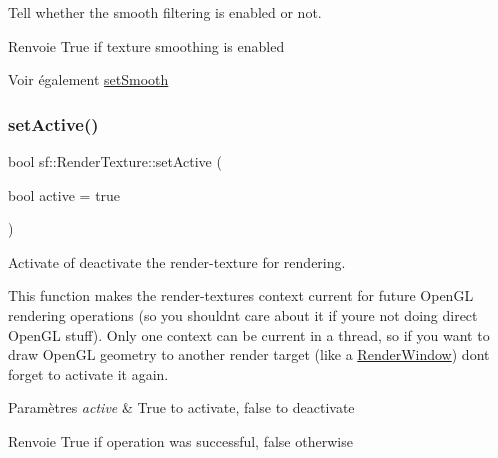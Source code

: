 Tell whether the smooth filtering is enabled or not. 

\begin{DoxyReturn}{Renvoie}
True if texture smoothing is enabled
\end{DoxyReturn}
\begin{DoxySeeAlso}{Voir également}
\hyperlink{classsf_1_1RenderTexture_af08991e63c6020865dd07b20e27305b6}{set\+Smooth} 
\end{DoxySeeAlso}
\mbox{\label{classsf_1_1RenderTexture_a5da95ecdbce615a80bb78399012508cf}} 
\subsubsection{\texorpdfstring{set\+Active()}{setActive()}}
{\footnotesize\ttfamily bool sf\+::\+Render\+Texture\+::set\+Active (\begin{DoxyParamCaption}\item[{bool}]{active = {\ttfamily true} }\end{DoxyParamCaption})}



Activate of deactivate the render-\/texture for rendering. 

This function makes the render-\/texture\textquotesingle{}s context current for future Open\+GL rendering operations (so you shouldn\textquotesingle{}t care about it if you\textquotesingle{}re not doing direct Open\+GL stuff). Only one context can be current in a thread, so if you want to draw Open\+GL geometry to another render target (like a \hyperlink{classsf_1_1RenderWindow}{Render\+Window}) don\textquotesingle{}t forget to activate it again.


\begin{DoxyParams}{Paramètres}
{\em active} & True to activate, false to deactivate\\
\hline
\end{DoxyParams}
\begin{DoxyReturn}{Renvoie}
True if operation was successful, false otherwise 
\end{DoxyReturn}
\mbox{\label{classsf_1_1RenderTexture_af8f97b33512bf7d5b6be3da6f65f7365}} 
